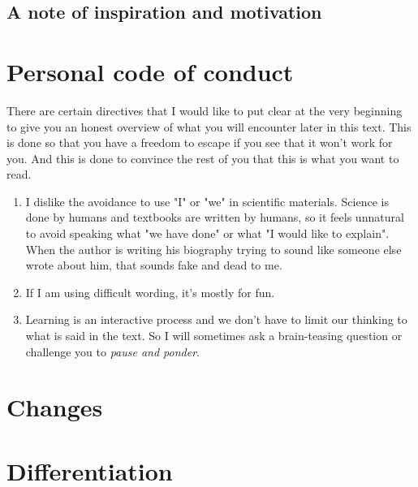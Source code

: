 \documentclass[10pt]{report}
\begin{document}
\section*{A note of inspiration and motivation}

\newpage

\chapter*{Personal code of conduct}

There are certain directives that I would like to put clear at the very beginning to give you an honest overview of what you will encounter later in this text. This is done so that you have a freedom to escape if you see that it won't work for you. And this is done to convince the rest of you that this is what you want to read.

\begin{enumerate}
\item I dislike the avoidance to use "I" or "we" in scientific materials. Science is done by humans and textbooks are written by humans, so it feels unnatural to avoid speaking what "we have done" or what "I would like to explain". When the author is writing his biography trying to sound like someone else wrote about him, that sounds fake and dead to me.
\item If I am using difficult wording, it's mostly for fun.
\item Learning is an interactive process and we don't have to limit our thinking to what is said in the text. So I will sometimes ask a brain-teasing question or challenge you to \textit{pause and ponder}.
\end{enumerate}

\chapter{Changes}








\chapter{Differentiation}
\end{document}
